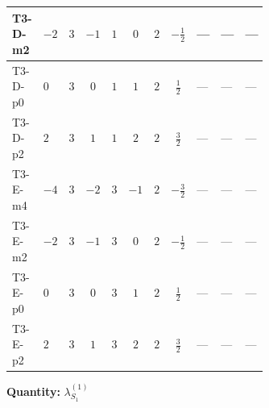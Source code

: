 \documentclass[8pt]{article}
\begin{document}
\begin{landscape}
\begin{longtable}{@{}llcccccc >{\raggedright\arraybackslash}p{0.21\linewidth} >{\raggedright\arraybackslash}p{0.21\linewidth} >{\raggedright\arraybackslash}p{0.21\linewidth}@{}}
\midrule
T3-D-m2 & $-2$ & $3$ & $-1$ & $1$ & $0$ & $2$ & $-\frac{1}{2}$ & --- & --- & --- \\
\midrule
T3-D-p0 & $0$ & $3$ & $0$ & $1$ & $1$ & $2$ & $\frac{1}{2}$ & --- & --- & --- \\
\midrule
T3-D-p2 & $2$ & $3$ & $1$ & $1$ & $2$ & $2$ & $\frac{3}{2}$ & --- & --- & --- \\
\midrule
T3-E-m4 & $-4$ & $3$ & $-2$ & $3$ & $-1$ & $2$ & $-\frac{3}{2}$ & --- & --- & --- \\
\midrule
T3-E-m2 & $-2$ & $3$ & $-1$ & $3$ & $0$ & $2$ & $-\frac{1}{2}$ & --- & --- & --- \\
\midrule
T3-E-p0 & $0$ & $3$ & $0$ & $3$ & $1$ & $2$ & $\frac{1}{2}$ & --- & --- & --- \\
\midrule
T3-E-p2 & $2$ & $3$ & $1$ & $3$ & $2$ & $2$ & $\frac{3}{2}$ & --- & --- & --- \\
\midrule
\bottomrule
\end{longtable}
\clearpage
\noindent\textbf{Quantity: }$\lambda_{S_1}^{(1)}$\par\smallskip

\end{landscape}
\end{document}
